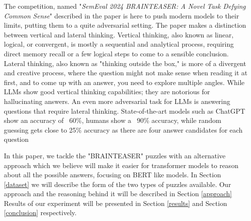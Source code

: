 The competition, named 
"\textit{SemEval 2024 BRAINTEASER: A Novel Task Defying Common Sense}" described in the paper 
\citep{semeval} is here to push modern models to their limits, putting
them to a quite adversarial setting. The paper makes a distinction between vertical and lateral
thinking. Vertical thinking, also known as linear, logical, or convergent, is mostly a sequential and
analytical process, requiring direct memory recall or a few logical steps to come to a sensible 
conclusion. Lateral thinking, also known as "thinking outside the box," is more of a divergent
and creative process, where the question might not make sense when reading it at first, and to come up with an answer, you need to explore multiple angles. While LLMs show good vertical thinking 
capabilities; they are notorious for hallucinating answers. An even more adversarial task for
LLMs is answering questions that require lateral thinking. State-of-the-art models such as
ChatGPT show an accuracy of ~60\%, humans show a ~90\% accuracy, while random 
guessing gets close to 25\% accuracy as there are four answer candidates for each question

In this paper, we tackle the "BRAINTEASER" puzzles with an
alternative approach which we believe will make it easier for transformer models to reason about all the
possible answers, focusing on BERT like models. In Section \ref{dataset} we will describe the form of the two types of puzzles available. 
Our approach and the reasoning behind it will be described in Section
\ref{approach}  Results of our experiment will be presented in Section \ref{results} and 
Section \ref{conclusion} respectively.


